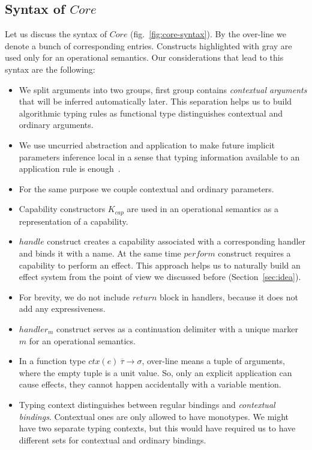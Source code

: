 \documentclass[acmsmall]{acmart}
\newcommand{\ctx}[1]{ctx(#1)~}
\begin{document}
\subsection{Syntax of $Core$} \label{subsec:syntax-core}

Let us discuss the syntax of $Core$ (fig.\ \ref{fig:core-syntax}).
By the over-line we denote a bunch of corresponding entries.
Constructs highlighted with gray are used only for an operational semantics.
Our considerations that lead to this syntax are the following:
\begin{itemize}
    \item We split arguments into two groups, first group contains \textit{contextual arguments} that will be inferred automatically later.
    This separation helps us to build algorithmic typing rules as functional type distinguishes contextual and ordinary arguments.
    \item We use uncurried abstraction and application to make future implicit parameters inference local in a sense that typing information available to an application rule is enough~\cite{pierce2000local}.
    \item For the same purpose we couple contextual and ordinary parameters.
    \item Capability constructors $K_{cap}$ are used in an operational semantics as a representation of a capability. %
    \item $handle$ construct creates a capability associated with a corresponding handler and binds it with a name.
    At the same time $perform$ construct requires a capability to perform an effect.
    This approach helps us to naturally build an effect system from the point of view we discussed before (Section~\ref{sec:idea}).
    \item For brevity, we do not include $return$ block in handlers, because it does not add any expressiveness.
    \item $handler_m$ construct serves as a continuation delimiter with a unique marker $m$ for an operational semantics.
    \item In a function type $\ctx{e} \overline{\tau} \to \sigma$, over-line means a tuple of arguments, where the empty tuple is a unit value.
    So, only an explicit application can cause effects, they cannot happen accidentally with a variable mention.
    \item Typing context distinguishes between regular bindings and \textit{contextual bindings}.
    Contextual ones are only allowed to have monotypes.
    We might have two separate typing contexts, but this would have required us to have different sets for contextual and ordinary bindings.
\end{itemize}
\end{document}
